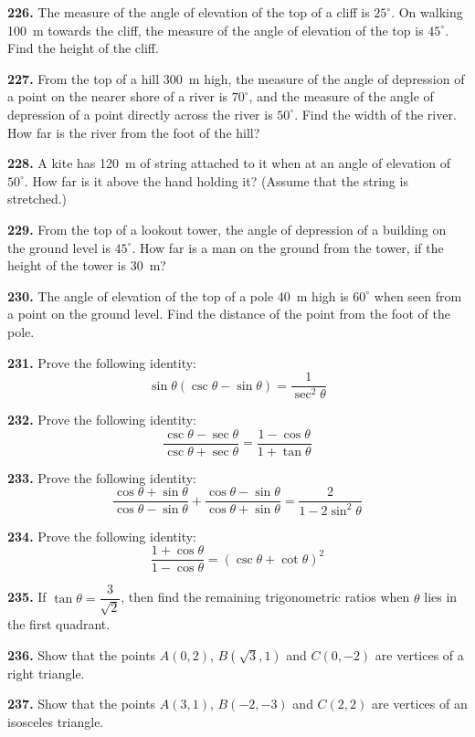 \documentclass[11pt]{article}
\begin{document}
\bigskip
\noindent\textbf{226.} The measure of the angle of elevation of the top of a cliff is $25^{\circ}$. On walking 100~m towards the cliff, the measure of the angle of elevation of the top is $45^{\circ}$. Find the height of the cliff.

\bigskip
\noindent\textbf{227.} From the top of a hill 300~m high, the measure of the angle of depression of a point on the nearer shore of a river is $70^{\circ}$, and the measure of the angle of depression of a point directly across the river is $50^{\circ}$. Find the width of the river. How far is the river from the foot of the hill?

\bigskip
\noindent\textbf{228.} A kite has 120~m of string attached to it when at an angle of elevation of $50^{\circ}$. How far is it above the hand holding it? (Assume that the string is stretched.)

\bigskip
\noindent\textbf{229.} From the top of a lookout tower, the angle of depression of a building on the ground level is $45^{\circ}$. How far is a man on the ground from the tower, if the height of the tower is 30~m?

\bigskip
\noindent\textbf{230.} The angle of elevation of the top of a pole 40~m high is $60^{\circ}$ when seen from a point on the ground level. Find the distance of the point from the foot of the pole.

\bigskip
\noindent\textbf{231.} Prove the following identity:
\[
\sin\theta(\csc\theta - \sin\theta) = \frac{1}{\sec^2\theta}
\]

\bigskip
\noindent\textbf{232.} Prove the following identity:
\[
\frac{\csc\theta - \sec\theta}{\csc\theta + \sec\theta} = \frac{1-\cos\theta}{1+\tan\theta}
\]

\bigskip
\noindent\textbf{233.} Prove the following identity:
\[
\frac{\cos\theta+\sin\theta}{\cos\theta-\sin\theta} + \frac{\cos\theta-\sin\theta}{\cos\theta+\sin\theta} = \frac{2}{1-2\sin^2\theta}
\]

\bigskip
\noindent\textbf{234.} Prove the following identity:
\[
\frac{1+\cos\theta}{1-\cos\theta} = (\csc\theta + \cot\theta)^2
\]

\bigskip
\noindent\textbf{235.} If $\tan\theta = \dfrac{3}{\sqrt{2}}$, then find the remaining trigonometric ratios when $\theta$ lies in the first quadrant.

\bigskip
\noindent\textbf{236.} Show that the points $A(0,2)$, $B(\sqrt{3}, 1)$ and $C(0,-2)$ are vertices of a right triangle.

\bigskip
\noindent\textbf{237.} Show that the points $A(3,1)$, $B(-2,-3)$ and $C(2,2)$ are vertices of an isosceles triangle.
\end{document}
